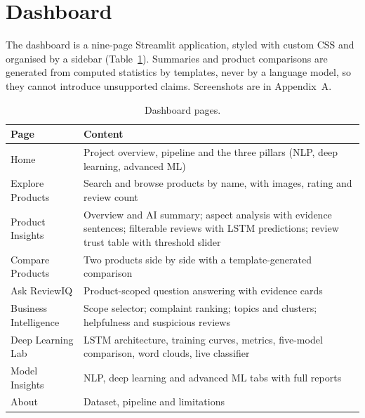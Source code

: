 \documentclass[12pt,a4paper]{report}
\begin{document}
\section{Dashboard}
The dashboard is a nine-page Streamlit application, styled with custom CSS and organised by a sidebar (Table~\ref{tab:pages}). Summaries and product comparisons are generated from computed statistics by templates, never by a language model, so they cannot introduce unsupported claims. Screenshots are in Appendix~A.
\begin{table}[htbp]
\centering
\caption{Dashboard pages.}\label{tab:pages}
\small
\begin{tabularx}{\textwidth}{@{}>{\raggedright\arraybackslash}p{3.8cm}X@{}}
\toprule
Page & Content \\
\midrule
Home & Project overview, pipeline and the three pillars (NLP, deep learning, advanced ML) \\
Explore Products & Search and browse products by name, with images, rating and review count \\
Product Insights & Overview and AI summary; aspect analysis with evidence sentences; filterable reviews with LSTM predictions; review trust table with threshold slider \\
Compare Products & Two products side by side with a template-generated comparison \\
Ask ReviewIQ & Product-scoped question answering with evidence cards \\
Business Intelligence & Scope selector; complaint ranking; topics and clusters; helpfulness and suspicious reviews \\
Deep Learning Lab & LSTM architecture, training curves, metrics, five-model comparison, word clouds, live classifier \\
Model Insights & NLP, deep learning and advanced ML tabs with full reports \\
About & Dataset, pipeline and limitations \\
\bottomrule
\end{tabularx}
\end{table}
\end{document}
